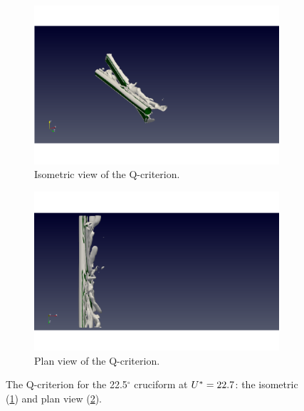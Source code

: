 \documentclass[oneside]{utmthesis}
\begin{document}
\begin{figure}
  \centering
  \begin{subfigure}[h]{0.9\textwidth}
    \includegraphics[width=\textwidth]{figs/qIso225U10}
    \caption{Isometric view of the Q-criterion.}
    \label{fig:qIso225U10}
  \end{subfigure}

  \begin{subfigure}[h]{0.9\textwidth}
    \includegraphics[width=\textwidth]{figs/qTop225U10}
    \caption{Plan view of the Q-criterion.}
    \label{fig:qTop225U10}
  \end{subfigure}

  \caption{The Q-criterion for the 22.5$^{\circ}$ cruciform at $U^{*} = 22.7$: the isometric (\ref{fig:qIso225U10}) and plan view (\ref{fig:qTop225U10}).} \label{fig:qCrit225U10}
\end{figure}
\end{document}
